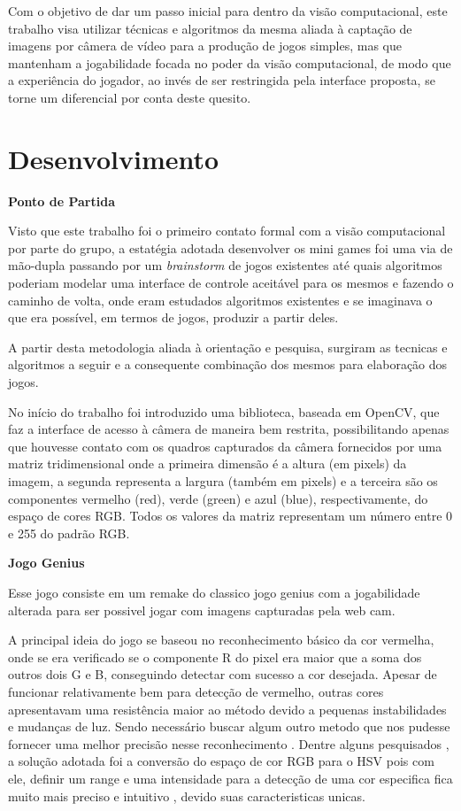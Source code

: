 \documentclass[a4paper]{article}
\begin{document}
Com o objetivo de dar um passo inicial para dentro da visão computacional, este trabalho visa utilizar técnicas e algoritmos da mesma aliada à captação de imagens por câmera de vídeo para a produção de jogos simples, mas que mantenham a jogabilidade focada no poder da visão computacional, de modo que a experiência do jogador, ao invés de ser restringida pela interface proposta, se torne um diferencial por conta deste quesito.



\section{Desenvolvimento}



\textbf{\large Ponto de Partida}


Visto que este trabalho foi o primeiro contato formal com a visão computacional por parte do grupo, a estatégia adotada desenvolver os mini games foi uma via de mão-dupla passando por um \textit{brainstorm} de jogos existentes até quais algoritmos poderiam modelar uma interface de controle aceitável para os mesmos e fazendo o caminho de volta, onde eram estudados algoritmos existentes e se imaginava o que era possível, em termos de jogos, produzir a partir deles.

A partir desta metodologia aliada à orientação e pesquisa, surgiram as tecnicas e algoritmos a seguir e a consequente combinação dos mesmos para elaboração dos jogos. 

No início do trabalho foi introduzido uma biblioteca, baseada em OpenCV, que faz a interface de acesso à câmera de maneira bem restrita, possibilitando apenas que houvesse contato com os quadros capturados da câmera fornecidos por uma matriz tridimensional onde a primeira dimensão é a altura (em pixels) da imagem, a segunda representa a largura (também em pixels) e a terceira são os componentes vermelho (red), verde (green) e azul (blue), respectivamente, do espaço de cores RGB. Todos os valores da matriz representam um número entre 0 e 255 do padrão RGB.

\begin{flushleft}
\textbf{\large Jogo Genius}
\end{flushleft}
Esse jogo consiste em um remake do classico jogo genius com a jogabilidade alterada para ser possivel jogar com imagens capturadas pela web cam.

A principal ideia do jogo se baseou no reconhecimento básico da cor vermelha, onde se era verificado se o componente R do pixel era maior que a soma dos outros dois G e B, conseguindo detectar com sucesso a cor desejada. Apesar de funcionar relativamente bem para detecção de vermelho, outras cores apresentavam uma resistência maior ao método devido a pequenas instabilidades e mudanças de luz. Sendo necessário buscar algum outro metodo que nos pudesse fornecer uma melhor precisão nesse reconhecimento . Dentre alguns pesquisados , a solução adotada foi a conversão do espaço de cor RGB para o HSV pois com ele, definir um range e uma intensidade para a detecção de uma cor especifica fica muito mais preciso e intuitivo , devido suas caracteristicas unicas.
\end{document}
